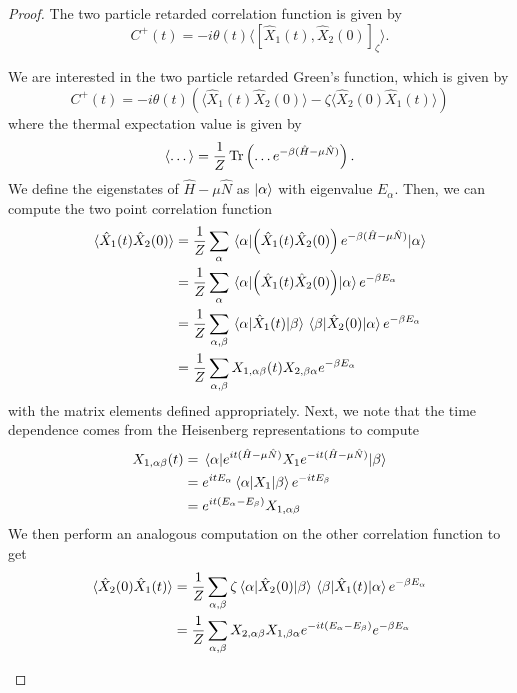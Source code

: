 \begin{proof}
	The two particle retarded correlation function is given by
	\[
		C^+(t)=-i\theta(t)\langle [\hat{X}_1(t), \hat{X}_2(0)]_\zeta\rangle
	.\] 
	\begin{tcolorbox}[title=Derivation of the Lehmann Representation, breakable]
		We are interested in the two particle retarded Green's function, which is given by
		\[
		C^+(t) = -i\theta(t)\left( \langle \hat{X}_1(t)\hat{X}_2(0)\rangle - \zeta \langle\hat{X}_2(0)\hat{X}_1(t)\rangle \right) 
		\]
		where the thermal expectation value is given by
		\[
			\langle \dots\rangle = \frac{1}{Z}\Tr \left(\dots e^{-\beta(\hat{H}-\mu \hat{N})}\right)
		.\] 
		We define the eigenstates of $\hat{H}-\mu \hat{N}$ as $\ket{\alpha}$ with eigenvalue $E_\alpha$. Then, we can compute the two point correlation function
		\begin{align*}
			\langle \hat{X}_1(t)\hat{X}_2(0)\rangle &= \frac{1}{Z}\sum_\alpha \mel{\alpha}{\left( \hat{X}_1(t)\hat{X}_2(0) \right)e^{-\beta(\hat{H}-\mu \hat{N})}}{\alpha} \\
								&= \frac{1}{Z}\sum_\alpha \mel{\alpha}{\left( \hat{X}_1(t)\hat{X}_2(0) \right)}{\alpha}e^{-\beta E_\alpha} \\
								&= \frac{1}{Z}\sum_{\alpha,\beta} \mel{\alpha}{\hat{X}_1(t)}{\beta}\mel{\beta}{\hat{X}_2(0)}{\alpha}e^{-\beta E_\alpha} \\
								&= \frac{1}{Z}\sum_{\alpha,\beta} {X}_{1,\alpha\beta}(t) X_{2,\beta\alpha} e^{-\beta E_\alpha} 
		\end{align*}
		with the matrix elements defined appropriately. Next, we note that the time dependence comes from the Heisenberg representations to compute
		\begin{align*}
			X_{1,\alpha\beta}(t) &= \mel{\alpha}{e^{it(\hat{H}-\mu \hat{N})}X_1 e^{-it(\hat{H}-\mu \hat{N})}}{\beta}\\
			&= e^{itE_\alpha} \mel{\alpha}{X_1}{\beta} e^{-itE_\beta} \\
			&= e^{it(E_\alpha-E_\beta)} X_{1,\alpha\beta} 
		\end{align*}
		We then perform an analogous computation on the other correlation function to get
		\begin{align*}
			\langle \hat{X}_2(0) \hat{X}_1(t)\rangle &= \frac{1}{Z}\sum_{\alpha,\beta} \zeta \mel{\alpha}{\hat{X}_2(0)}{\beta}\mel{\beta}{\hat{X}_1(t)}{\alpha} e^{-\beta E_\alpha} \\
								 &= \frac{1}{Z}\sum_{\alpha,\beta}{X}_{2,\alpha\beta}X_{1,\beta\alpha}e^{-it(E_\alpha-E_\beta)} e^{-\beta E_\alpha} \\

\end{align*}
\end{tcolorbox}
\end{proof}
